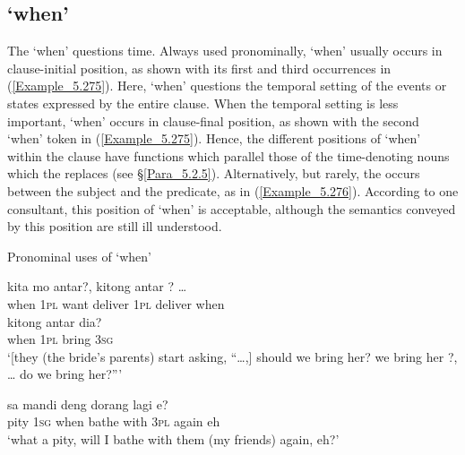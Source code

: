 \subsection{ ‘when’}
\label{Para_5.8.5}
The   ‘when’ questions time. Always used pronominally,  ‘when’ usually occurs in clause-initial position, as shown with its first and third occurrences in (\ref{Example_5.275}). Here,  ‘when’ questions the temporal setting of the events or states expressed by the entire clause. When the temporal setting is less important,  ‘when’ occurs in clause-final position, as shown with the second  ‘when’ token in (\ref{Example_5.275}). Hence, the different positions of  ‘when’ within the clause have functions which parallel those of the time-denoting nouns which the  replaces (see §\ref{Para_5.2.5}). Alternatively, but rarely, the  occurs between the subject and the predicate, as in (\ref{Example_5.276}). According to one consultant, this position of  ‘when’ is acceptable, although the semantics conveyed by this position are still ill understood.


\begin{styleExampleTitle}
Pronominal uses of  ‘when’
\end{styleExampleTitle}

\ea
\label{Example_5.275}
 {kita} {{mo}} {{antar?,}} {kitong} {antar} {?} {{\ldots}}\\ %
 when  \textsc{1pl}  {want}  {deliver}  \textsc{1pl}  deliver  when  \\
 \gll {}  {kitong}  {antar}  {dia?}\\
 when  {\textsc{1pl}}  {bring}  {\textsc{3sg}}\\
 ‘[they (the bride’s parents) start asking, ``{\ldots},]  should we bring her? we bring her ?, {\ldots}  do we bring her?''' \textstyleExampleSource{[081110-005-CvPr.0043-0044]}
\z

\ea
\label{Example_5.276}
 {sa} {} {mandi} {deng} {dorang} {lagi} {e?}\\ %
 pity  \textsc{1sg}  when  bathe  with  \textsc{3pl}  again  eh\\
 ‘what a pity,  will I bathe with them (my friends) again, eh?’ \textstyleExampleSource{[081025-009b-Cv.0044]}
\z


